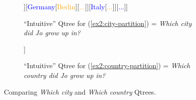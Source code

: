 \begin{figure}[H]
	\centering
	\begin{subfigure}[t]{.45\linewidth}
		\centering
		\begin{forest}
			[{CS\\
				Jo grew up in...}[\textcolor{blue}{France}[\textcolor{orange}{{Paris}}][\textcolor{orange}{Lyon}][\textcolor{orange}{...}]][\textcolor{blue}{Germany}[\textcolor{orange}{Berlin}][\textcolor{orange}{...}]][\textcolor{blue}{Italy}[\textcolor{orange}{...}]][\textcolor{blue}{...}]]
		\end{forest}
		\caption{``Intuitive'' Qtree for (\ref{ex2:city-partition}) = \textit{Which city did Jo grow up in?}}\label{fig2:city-qtree-repeated2}
	\end{subfigure}\hfill
	\begin{subfigure}[t]{.45\linewidth}
		\centering
		\begin{forest}
			[{CS\\
				Jo grew up in...}[\textcolor{blue}{France}][\textcolor{blue}{Germany}][\textcolor{blue}{Italy}][\textcolor{blue}{...}]]
		\end{forest}
		\caption{``Intuitive'' Qtree for (\ref{ex2:country-partition}) = \textit{Which country did Jo grow up in?}}\label{fig2:country-qtree}
	\end{subfigure}
	\caption{Comparing \textit{Which city} and \textit{Which country} Qtrees.}\label{fig:qtrees-diff-gran}
\end{figure}

